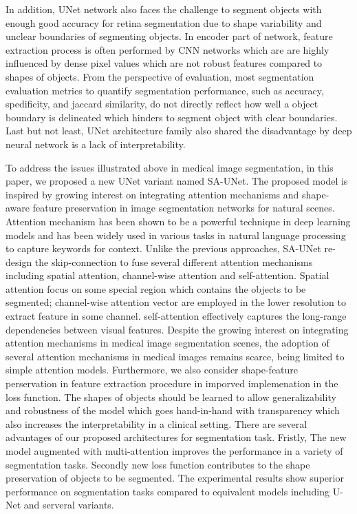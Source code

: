\documentclass{ieeeaccess}
\begin{document}
In addition, UNet network also faces the challenge to segment objects with enough good accuracy for retina segmentation due to 
shape variability and unclear boundaries of segmenting objects. In encoder part of network, feature extraction process is often performed by CNN networks which are are highly influenced by dense pixel values which are not robust features compared to shapes of objects. From the perspective of evaluation,  most segmentation evaluation metrics to quantify segmentation performance, such as accuracy, spedificity, and jaccard similarity, do not directly reflect how well a object boundary is delineated which hinders to segment object with clear boundaries. Last but not least,  UNet architecture family also shared the disadvantage by deep neural network is a lack of interpretability. 

To address the issues illustrated above in medical image segmentation, in this paper, we proposed a new UNet variant named SA-UNet. The proposed model is inspired by growing interest on integrating attention mechanisms and shape-aware feature preservation in image segmentation networks for natural scenes. Attention mechanism has been shown to be a powerful technique in deep learning models and has been widely used in various tasks in natural language processing to capture keywords for context. Unlike the previous approaches, SA-UNet re-design the skip-connection to fuse several different attention mechanisms including spatial attention, channel-wise attention and self-attention. Spatial attention focus on some special region which contains the objects to be segmented; channel-wise attention vector are employed in the lower resolution to extract feature in some channel. self-attention effectively captures the long-range dependencies between visual features. Despite the growing interest on integrating attention mechanisms in medical image segmentation scenes, the adoption of several attention mechanisms in medical images remains scarce, being limited to simple attention models. Furthermore, we also consider shape-feature perservation in feature extraction procedure in imporved implemenation in the loss function.  The shapes of objects should be learned to allow generalizability and robustness of the model which goes hand-in-hand with transparency which also increases the interpretability in a clinical setting. There are several advantages of our proposed architectures for segmentation task. Fristly, The new model augmented with multi-attention improves the performance in a variety of  segmentation tasks. Secondly new loss function contributes to the shape preservation of objects to be segmented. The experimental results show superior performance on segmentation tasks compared to equivalent models including U-Net and serveral variants. 
\end{document}

